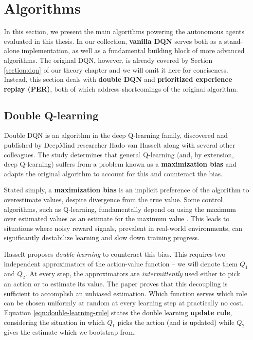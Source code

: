 \section{Algorithms} \label{section:approach-algorithms}
In this section, we present the main algorithms powering the autonomous agents evaluated in this thesis. In our collection, \textbf{vanilla DQN} serves both as a stand-alone implementation, as well as a fundamental building block of more advanced algorithms.
The original DQN, however, is already covered by Section \ref{section:dqn} of our theory chapter and we will omit it here for conciseness.
Instead, this section deals with \textbf{double DQN} and \textbf{prioritized experience replay (PER)}, both of which address shortcomings of the original algorithm.

\subsection{Double Q-learning}
Double DQN \cite{ddqn-paper} is an algorithm in the deep Q-learning family, discovered and published by DeepMind researcher Hado van Hasselt along with several other colleagues.
The study determines that general Q-learning (and, by extension, deep Q-learning) suffers from a problem known as a \textbf{maximization bias} and adapts the original algorithm to account for this and counteract the bias.

Stated simply, a \textbf{maximization bias} is an implicit preference of the algorithm to overestimate values, despite divergence from the true value.
Some control algorithms, such as Q-learning, fundamentally depend on using the maximum over estimated values as an estimate for the maximum value \cite{rlai}.
This leads to situations where noisy reward signals, prevalent in real-world environments, can significantly destabilize learning and slow down training progress.

Hasselt proposes \emph{double learning} to counteract this bias.
This requires two independent approximators of the action-value function -- we will denote them $Q_1$ and $Q_2$.
At every step, the approximators are \emph{intermittently} used either to pick an action or to estimate its value.
The paper proves that this decoupling is sufficient to accomplish an unbiased estimation.
Which function serves which role can be chosen uniformly at random at every learning step at practically no cost.
Equation \ref{eqn:double-learning-rule} states the double learning \textbf{update rule}, considering the situation in which $Q_1$ picks the action (and is updated) while $Q_2$ gives the estimate which we bootstrap from.

